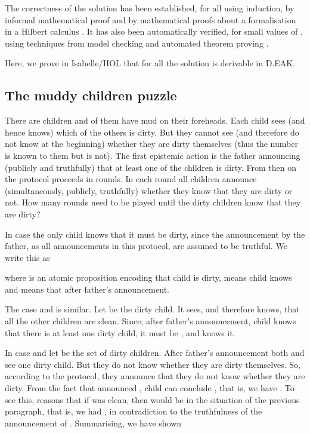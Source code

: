\documentclass[runningheads,a4paper]{llncs}
\begin{document}
The correctness of the solution has been established, for all  using induction,  by informal mathematical proof \cite{FHMV} and by mathematical proofs about a formalisation in a Hilbert calculus \cite{MaPS14}. It has also been automatically verified, for small values of , using techniques from model checking \cite{HalpernVardi}  and automated theorem proving \cite{Dyckhoff,Truffaut:msc}.

Here, we prove in Isabelle/HOL that for all  the solution is derivable in D.EAK.

\subsection{The muddy children puzzle}
There are  children and  of them have mud on their foreheads. Each child sees (and hence knows) which of the others is dirty. But they cannot see (and therefore do not know at the beginning) whether they are dirty themselves (thus the number  is known to them but  is not). The first epistemic action is the father announcing (publicly and truthfully) that at least one of the children is dirty. From then on the protocol proceeds in rounds. In each round all children announce (simultaneously, publicly, truthfully) whether they know that they are dirty or not. How many rounds need to be played until the dirty children know that they are dirty?

\newcommand{\father}{\textsf{father}}
\newcommand{\no}{\textsf{no}}

\medskip\noindent In case  the only child knows that it must be dirty, since the announcement by the father, as all announcements in this protocol, are assumed to be truthful. We write this as 

where  is an atomic proposition encoding that child  is dirty,  means child  knows  and  means that  after father's announcement.

\medskip\noindent The case  and  is similar. Let  be the dirty child. It sees, and therefore knows, that all the other children are clean. Since, after father's announcement, child  knows that there is at least one dirty child, it must be , and  knows it.

\medskip\noindent In case  and  let  be the set of dirty children. After father's announcement both  and  see one dirty child. But they do not know whether they are dirty themselves. So, according to the protocol, they announce that they do not know whether they are dirty. From the fact that  announced , child  can conclude , that is, we have .
To see this,  reasons that if  was clean, then  would be in the situation of the previous paragraph, that is, we had , in contradiction to the truthfulness of the announcement of .
Summarising, we have shown 
\end{document}
